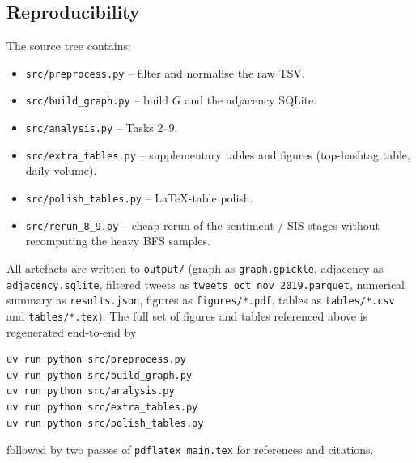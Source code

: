 \documentclass[conference]{IEEEtran}
\begin{document}
\subsection{Reproducibility}
\label{app:repro}
The source tree contains:
\begin{itemize}
  \item \texttt{src/preprocess.py} -- filter and normalise the
        raw TSV.
  \item \texttt{src/build\_graph.py} -- build $G$ and the
        adjacency SQLite.
  \item \texttt{src/analysis.py} -- Tasks 2--9.
  \item \texttt{src/extra\_tables.py} -- supplementary tables
        and figures (top-hashtag table, daily volume).
  \item \texttt{src/polish\_tables.py} -- LaTeX-table polish.
  \item \texttt{src/rerun\_8\_9.py} -- cheap rerun of the
        sentiment / SIS stages without recomputing the heavy
        BFS samples.
\end{itemize}
All artefacts are written to \texttt{output/} (graph as
\texttt{graph.gpickle}, adjacency as \texttt{adjacency.sqlite},
filtered tweets as
\texttt{tweets\_oct\_nov\_2019.parquet}, numerical summary as
\texttt{results.json}, figures as \texttt{figures/*.pdf},
tables as \texttt{tables/*.csv} and \texttt{tables/*.tex}).
The full set of figures and tables referenced above is
regenerated end-to-end by
\begin{verbatim}
uv run python src/preprocess.py
uv run python src/build_graph.py
uv run python src/analysis.py
uv run python src/extra_tables.py
uv run python src/polish_tables.py
\end{verbatim}
followed by two passes of \texttt{pdflatex main.tex} for
references and citations.
\end{document}
